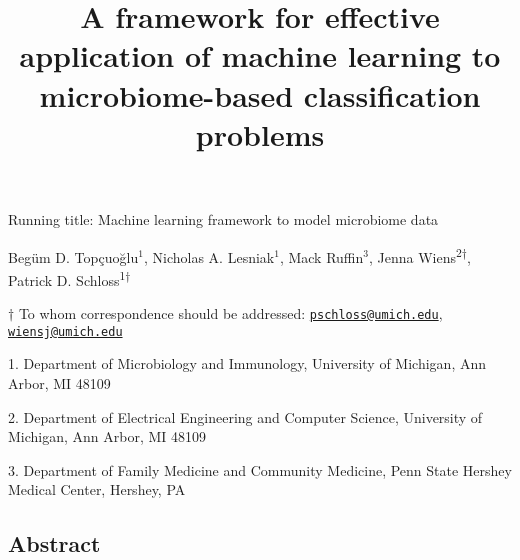 \documentclass[
  11pt,
]{article}
\title{\textbf{A framework for effective application of machine learning to
microbiome-based classification problems}}
\author{}
\date{\vspace{-2.5em}}
\begin{document}
\maketitle

\vspace{30mm}

Running title: Machine learning framework to model microbiome data

\vspace{20mm}

Begüm D. Topçuoğlu\({^1}\), Nicholas A. Lesniak\({^1}\), Mack
Ruffin\({^3}\), Jenna Wiens\textsuperscript{2\(\dagger\)}, Patrick D.
Schloss\textsuperscript{1\(\dagger\)}

\vspace{30mm}

\(\dagger\) To whom correspondence should be addressed:
\href{mailto:pschloss@umich.edu}{\nolinkurl{pschloss@umich.edu}},
\href{mailto:wiensj@umich.edu}{\nolinkurl{wiensj@umich.edu}}

1. Department of Microbiology and Immunology, University of Michigan,
Ann Arbor, MI 48109

2. Department of Electrical Engineering and Computer Science, University
of Michigan, Ann Arbor, MI 48109

3. Department of Family Medicine and Community Medicine, Penn State
Hershey Medical Center, Hershey, PA

\newpage
\linenumbers

\hypertarget{abstract}{%
\subsection{Abstract}\label{abstract}}
\end{document}
